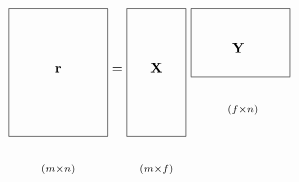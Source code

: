 \documentclass{article}
\newcommand*{\mat}[1]{\boldsymbol{\mathrm{#1}}}
\newcommand*{\subdims}[3]{\clap{\raisebox{#1}[0pt][0pt]{$\scriptstyle(#2 \times #3)$}}}
\begin{document}
\[
\framebox[2.5cm]{\clap{\raisebox{0pt}[1.5cm][1.5cm]{$\mat r$}}\subdims{-2.5cm} m n} =
\framebox[1.5cm]{\clap{\raisebox{0pt}[1.5cm][1.5cm]{$\mat X$}}\subdims{-2.5cm} m f} \ 
\framebox[2.5cm]{\clap{\raisebox{5mm}[1.5cm]{$\mat Y$}}     \subdims{-1cm} f n}
\]
\end{document}
